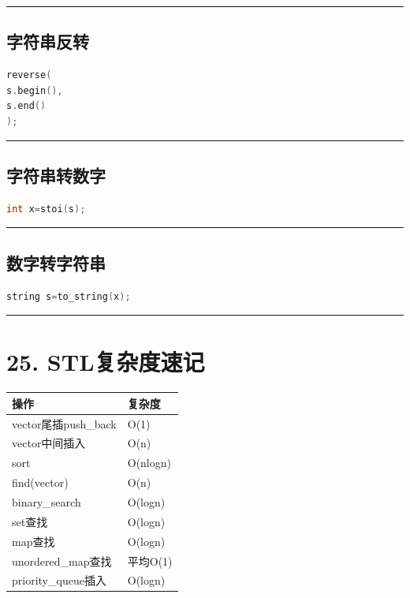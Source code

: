 \documentclass[10pt,twocolumn]{extarticle}
\begin{document}
\noindent\rule{\linewidth}{0.4pt}

\subsection{字符串反转}
\begin{lstlisting}[language=C++]
reverse(
s.begin(),
s.end()
);
\end{lstlisting}

\noindent\rule{\linewidth}{0.4pt}

\subsection{字符串转数字}
\begin{lstlisting}[language=C++]
int x=stoi(s);
\end{lstlisting}

\noindent\rule{\linewidth}{0.4pt}

\subsection{数字转字符串}
\begin{lstlisting}[language=C++]
string s=to_string(x);
\end{lstlisting}

\noindent\rule{\linewidth}{0.4pt}

\section{25. STL复杂度速记}

\begin{table}[h]
\centering
\begin{tabular}{|l|l|}
\hline
操作 & 复杂度 \\ \hline
vector尾插push\_back & O(1) \\ \hline
vector中间插入 & O(n) \\ \hline
sort & O(nlogn) \\ \hline
find(vector) & O(n) \\ \hline
binary\_search & O(logn) \\ \hline
set查找 & O(logn) \\ \hline
map查找 & O(logn) \\ \hline
unordered\_map查找 & 平均O(1) \\ \hline
priority\_queue插入 & O(logn) \\ \hline
\end{tabular}
\end{table}
\end{document}
